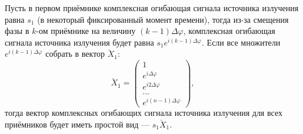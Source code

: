 Пусть в первом приёмнике комплексная огибающая сигнала источника излучения равна $s_1$ (в некоторый фиксированный момент времени), тогда из-за смещения фазы в
$k$-ом приёмнике на величину $(k-1) \Delta \varphi$, комплексная огибающая сигнала источника излучения будет равна $s_1 e^{i (k-1) \Delta \varphi}$. Если все
множители $e^{i (k-1) \Delta \varphi}$ собрать в вектор $\breve{X}_1$:
\begin{equation}
    \label{jammers:single:direction}
    \breve{X}_1
    =
    \begin{pmatrix}
        1                      \\
        e^{i \Delta \varphi}   \\
        e^{i 2 \Delta \varphi} \\
        \dots                  \\
        e^{i (n-1) \Delta \varphi}
    \end{pmatrix} ,
\end{equation}
тогда вектор комплексных огибающих сигнала источника излучения для всех приёмников будет иметь простой вид --- $s_1 \breve{X}_1$.

